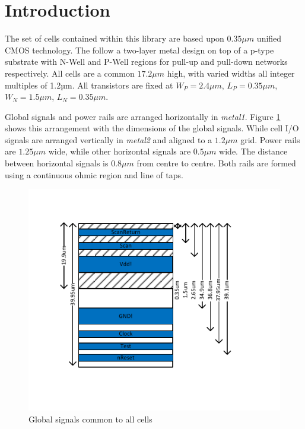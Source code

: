 \newpage
\section{Introduction}

The set of cells contained within this library are based upon $0.35\mu m$ unified CMOS technology. The follow a two-layer metal design on top of a p-type substrate with N-Well and P-Well regions for pull-up and pull-down networks respectively. All cells are a common $17.2\mu m$ high, with varied widths all integer multiples of 1.2µm. 
All transistors are fixed at $W_P = 2.4\mu m$, $L_P = 0.35\mu m$, $W_N = 1.5\mu m$, $L_N = 0.35\mu m$.


Global signals and power rails are arranged horizontally in \textit{metal1}.
Figure \ref{fig:globalsignals} shows this arrangement with the dimensions of the global signals.
While cell I/O signals are arranged vertically in \textit{metal2} and aligned to a $1.2\mu m$ grid.
Power rails are $1.25\mu m$ wide, while other horizontal signals are $0.5\mu m$ wide. 
The distance between horizontal signals is $0.8\mu m$ from centre to centre. 
Both rails are formed using a continuous ohmic region and line of taps. 

\begin{figure}[htb!]
\includegraphics[width=\textwidth]{cellglobals.pdf}
\caption{Global signals common to all cells}
\label{fig:globalsignals}
\end{figure}

